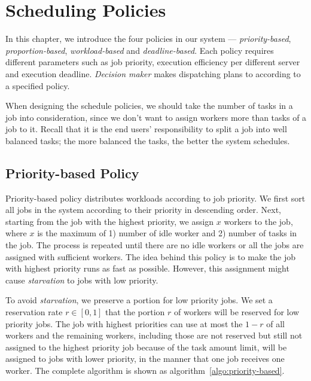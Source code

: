 \chapter{Scheduling Policies}\label{chap:policy}

In this chapter, we introduce the four policies in our system ---
\emph{priority-based}, \emph{proportion-based}, \emph{workload-based}
and \emph{deadline-based}.
Each policy requires different parameters such as job priority,
execution efficiency per different server and execution deadline.
\emph{Decision maker} makes dispatching plans to according to a
specified policy.

When designing the schedule policies, we should take the number of tasks
in a job into consideration, since we don't want to assign workers more
than tasks of a job to it.
Recall that it is the end users' responsibility to split a job into well
balanced tasks; the more balanced the tasks, the better the system
schedules.


\section{Priority-based Policy}

Priority-based policy distributes workloads according to job priority. 
We first sort all jobs in the system according to their priority in 
descending order.
Next, starting from the job with the highest priority, we assign $x$
workers to the job, where $x$ is the maximum of 1) number of idle worker
and 2) number of tasks in the job.
The process is repeated until there are no idle workers or all the jobs
are assigned with sufficient workers.
The idea behind this policy is to make the job with highest priority 
runs as fast as possible.
However, this assignment might cause \emph{starvation} to jobs with 
low priority.

To avoid \emph{starvation}, we preserve a portion for low priority jobs.
We set a reservation rate $r \in [0,1]$ that the portion $r$ of workers
will be reserved for low priority jobs.
The job with highest priorities can use at most the $1-r$ of all workers
and the remaining workers, including those are not reserved but still not
assigned to the highest priority job because of the task amount limit,
will be assigned to jobs with lower priority, in the manner that one job
receives one worker.
The complete algorithm is shown as algorithm~\ref{algo:priority-based}.


